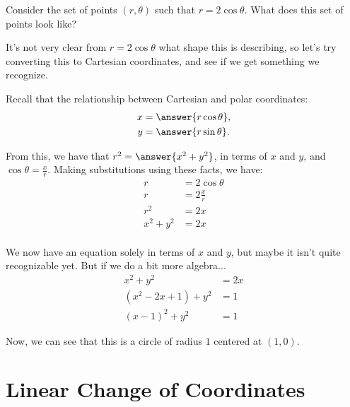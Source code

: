 \documentclass{ximera}
\begin{document}
\begin{example}
Consider the set of points $(r,\theta)$ such that $r = 2\cos\theta$. What does this set of points look like?

It's not very clear from $r=2\cos\theta$ what shape this is describing, so let's try converting this to Cartesian coordinates, and see if we get something we recognize.

Recall that the relationship between Cartesian and polar coordinates:
\begin{align*}
x &= \answer{r\cos\theta},\\
y &= \answer{r\sin\theta}.
\end{align*}

From this, we have that $r^2 = \answer{x^2+y^2}$, in terms of $x$ and $y$, and $\cos\theta = \frac{x}{r}$. Making substitutions using these facts, we have:
\begin{align*}
r &= 2\cos\theta\\
r &= 2\frac{x}{r}\\
r^2 &= 2x\\
x^2+y^2 &= 2x\\
\end{align*}

We now have an equation solely in terms of $x$ and $y$, but maybe it isn't quite recognizable yet. But if we do a bit more algebra...
\begin{align*}
x^2 + y^2 &= 2x\\
(x^2-2x+1) + y^2 &= 1\\
(x-1)^2 + y^2 &=1
\end{align*}

Now, we can see that this is a circle of radius $1$ centered at $(1,0)$.

\begin{image}
\end{image}

\end{example}

\section{Linear Change of Coordinates}
\end{document}

